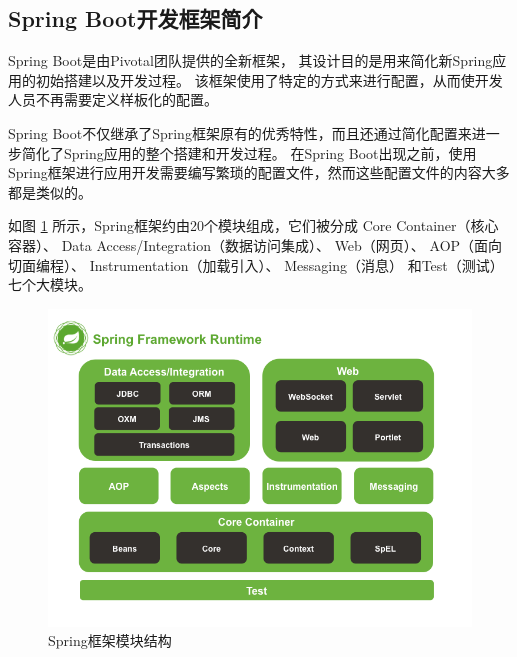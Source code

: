\subsection{Spring Boot开发框架简介}
Spring Boot是由Pivotal团队提供的全新框架，
其设计目的是用来简化新Spring应用的初始搭建以及开发过程。
该框架使用了特定的方式来进行配置，从而使开发人员不再需要定义样板化的配置。


Spring Boot不仅继承了Spring框架原有的优秀特性，而且还通过简化配置来进一步简化了Spring应用的整个搭建和开发过程。
在Spring Boot出现之前，使用Spring框架进行应用开发需要编写繁琐的配置文件，然而这些配置文件的内容大多都是类似的。

如图 \ref{Fig:spring} 所示，Spring框架约由20个模块组成，它们被分成
Core Container（核心容器）、
Data Access/Integration（数据访问集成）、
Web（网页）、
AOP（面向切面编程）、
Instrumentation（加载引入）、
Messaging（消息）
和Test（测试）七个大模块。

\begin{figure}[ht]
    \centering
    \includegraphics[scale=.4]{./Figure/IMG_spring.png}
    \caption{Spring框架模块结构}
    \label{Fig:spring}
\end{figure}

